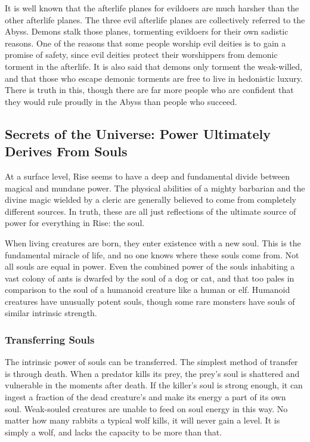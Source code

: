         It is well known that the afterlife planes for evildoers are much harsher than the other afterlife planes.
        The three evil afterlife planes are collectively referred to the Abyss.
        Demons stalk those planes, tormenting evildoers for their own sadistic reasons.
        One of the reasons that some people worship evil deities is to gain a promise of safety, since evil deities protect their worshippers from demonic torment in the afterlife.
        It is also said that demons only torment the weak-willed, and that those who escape demonic torments are free to live in hedonistic luxury.
        There is truth in this, though there are far more people who are confident that they would rule proudly in the Abyss than people who succeed.

    \subsection{Secrets of the Universe: Power Ultimately Derives From Souls}
        At a surface level, Rise seems to have a deep and fundamental divide between magical and mundane power.
        The physical abilities of a mighty barbarian and the divine magic wielded by a cleric are generally believed to come from completely different sources.
        In truth, these are all just reflections of the ultimate source of power for everything in Rise: the soul.

        When living creatures are born, they enter existence with a new soul.
        This is the fundamental miracle of life, and no one knows where these souls come from.
        Not all souls are equal in power.
        Even the combined power of the souls inhabiting a vast colony of ants is dwarfed by the soul of a dog or cat, and that too pales in comparison to the soul of a humanoid creature like a human or elf.
        Humanoid creatures have unusually potent souls, though some rare monsters have souls of similar intrinsic strength.

        \subsubsection{Transferring Souls}
            The intrinsic power of souls can be transferred.
            The simplest method of transfer is through death.
            When a predator kills its prey, the prey's soul is shattered and vulnerable in the moments after death.
            If the killer's soul is strong enough, it can ingest a fraction of the dead creature's and make its energy a part of its own soul.
            Weak-souled creatures are unable to feed on soul energy in this way.
            No matter how many rabbits a typical wolf kills, it will never gain a level.
            It is simply a wolf, and lacks the capacity to be more than that.


